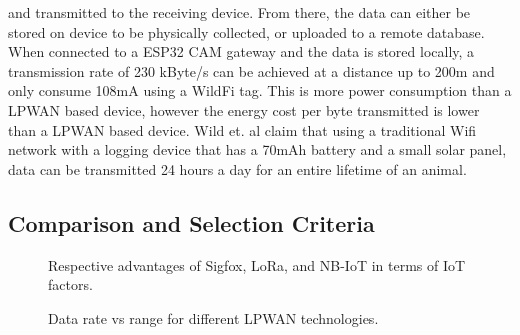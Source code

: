 \documentclass[sigplan,screen,nonacm]{acmart}
\begin{document}
and transmitted to the receiving device. From there, the data can either be stored on device 
to be physically collected, or uploaded to a remote database. When connected to a ESP32 CAM 
gateway and the data is stored locally, a transmission rate of 230 kByte/s can be achieved at 
a distance up to 200m and only consume 108mA using a WildFi tag\cite{wild2023internet}. This 
is more power consumption than a LPWAN based device, however the energy cost per byte 
transmitted is lower than a LPWAN based device. Wild et. al claim that using a traditional 
Wifi network with a logging device that has a 70mAh battery and a small solar panel, data can 
be transmitted 24 hours a day for an entire lifetime of an animal\cite{wild2023internet}.


\subsection{Comparison and Selection Criteria}
\label{subsec:Protocol Comparison and Selection Criteria}

\begin{figure}[htbp]
  \centering
  \caption{Respective advantages of Sigfox, LoRa, and NB-IoT in terms of IoT factors. \cite{mekki2019comparative}}
  \label{fig:LPWAN_comparison}
\end{figure}

\begin{figure}[htbp]
  \centering
  \caption{Data rate vs range for different LPWAN technologies. \cite{evanczukspeed}}
  \label{fig:LPWAN_data_rate_range}
\end{figure}
\end{document}
